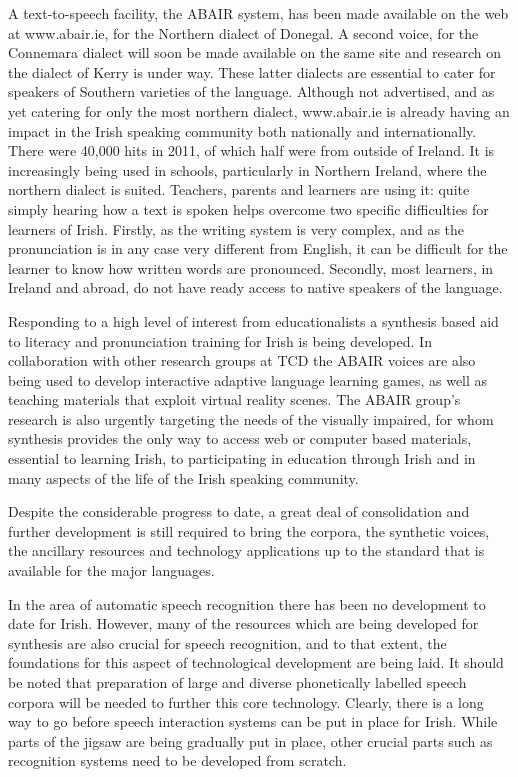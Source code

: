 \begin{multicols}{2}
A text-to-speech facility, the ABAIR system, has been made available on the web at www.abair.ie, for the Northern dialect of Donegal. A second voice, for the Connemara dialect will soon be made available on the same site and research on the dialect of Kerry is under way. These latter dialects are essential to cater for speakers of Southern varieties of the language.  
Although not advertised, and as yet catering for only the most northern dialect, www.abair.ie is already having an impact in the Irish speaking community both nationally and internationally. There were 40,000 hits in 2011, of which half were from outside of Ireland. It is increasingly being used in schools, particularly in Northern Ireland, where the northern dialect is suited. Teachers, parents and learners are using it: quite simply hearing how a text is spoken helps overcome two specific difficulties for learners of Irish. Firstly, as the writing system is very complex, and as the pronunciation is in any case very different from English, it can be difficult for the learner to know how written words are pronounced. Secondly, most learners, in Ireland and abroad, do not have ready access to native speakers of the language. 

Responding to a high level of interest from educationalists a synthesis based aid to literacy and pronunciation training for Irish is being developed. In collaboration with other research groups at TCD \cite{slate2011} the ABAIR voices are also being used to develop interactive adaptive language learning games, as well as teaching materials that exploit virtual reality scenes. The ABAIR group’s research is also urgently targeting the needs of the visually impaired, for whom synthesis provides the only way to access web or computer based materials, essential to learning Irish, to participating in education through Irish and in many aspects of the life of the Irish speaking community.

Despite the considerable progress to date, a great deal of consolidation and further development is still required to bring the corpora, the synthetic voices, the ancillary resources and technology applications up to the standard that is available for the major languages.

In the area of automatic speech recognition there has been no development to date for Irish. However, many of the resources which are being developed for synthesis are also crucial for speech recognition, and to that extent, the foundations for this aspect of technological development are being laid. It should be noted that preparation of large and diverse phonetically labelled speech corpora will be needed to further this core technology. Clearly, there is a long way to go before speech interaction systems can be put in place for Irish. While parts of the jigsaw are being gradually put in place, other crucial parts such as recognition systems need to be developed from scratch.


\end{multicols}
